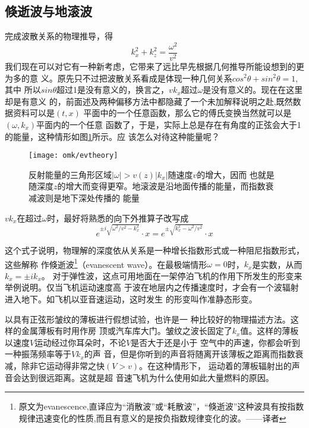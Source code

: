 \subsection{倏逝波与地滚波}
完成波散关系的物理推导，得
\begin{equation}
k_x^2+k_z^2=\frac{\omega^2}{v^2}
\label{eq:ex1.4.12}
\end{equation}
我们现在可以对它有一种新考虑，它带来了远比早先根据几何推导所能设想到的更为多的意
义。原先只不过把波散关系看成是体现一种几何关系$cos^2\theta+sin^2\theta=1$,其中
所以$sin\theta$超过1是没有意义的，换言之，$vk_x$超过$\omega$是没有意义的。现在在这里却是有意义
的，前面述及两种偏移方法中都隐藏了一个未加解释说明之赴,既然数据资料可以是$(t,x)$
平面中的一个任意函数，那么它的傅氏变换当然就可以是$(\omega,k_x)$平面内的一个任意
函数了，于是，实际上总是存在有角度的正弦会大于1的能量，这种情形如图\ref{fig:omk/evtheory}所示。应
该怎么对待这种能量呢？
\begin{figure}[H]
\centering
\texttt{[image: omk/evtheory]}
\caption[evtheory]{反射能量的三角形区域$|\omega|>v(z)|k_x|$随速度$v$的增大，因而
也就是随深度$z$的增大而变得更窄。地滚波是沿地面传播的能量，而指数衰减波则是地下深处传播的
能量}
\label{fig:omk/evtheory}
\end{figure}

$vk_x$在超过$\omega$时，最好将熟悉的向下外推算子改写成
\begin{equation}
e^{\pm i\sqrt{\omega^2/v^2-k_x^2}}\cdot x=e^{\pm\sqrt{k_x^2-\omega^2/v^2}}\cdot x
\label{eq:ex1.4.13}
\end{equation}

这个式子说明，物理解的深度依从关系是一种增长指数形式或一种阻尼指数形式，这些解称
作倏逝波\footnote{原文为evanescence,直译应为“消散波”或“耗散波”，“倏逝波”这种波具有按指数规律迅速变化的性质,而且有意义的是按负指数规律变化的波。——译者}（evanescent wave）。在最极端情形$\omega=0$时，$k_x$是实数，从而$k_x=\pm ik_x$。
对于弹性波，这点可用地面在一架停泊飞机的作用下所发生的形变来举例说明。仅当飞机运动速度高
于波在地层内之传播速度时，才会有一个波辐射进入地下。如飞机以亚音速运动，这时发生
的形变叫作准静态形变。

以具有正弦形皱纹的薄板进行假想试验，也许是一
种比较好的物理描述方法。这样的金属薄板有时用作房
顶或汽车库大门。皱纹之波长固定了$k_x$值。这样的薄板
以速度$V$运动经过你耳朵时，不论$V$是否大于还是小于
空气中的声速，你都会听到一种振荡频率等于$Vk_x$的声
音，但是你听到的声音将随离开该薄板之距离而指数衰
减，除非它运动得非常之快$(V>v)$。在这种情形下，
运动着的薄板辐射出的声音会达到很远距离。这就是超
音速飞机为什么使用如此大量燃料的原因。

